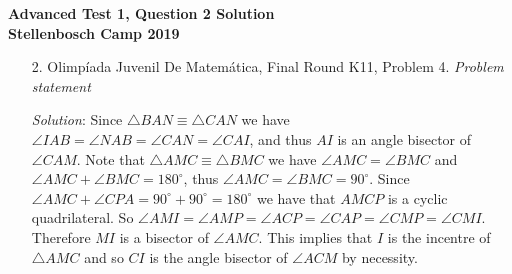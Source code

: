 \documentclass{article}
\begin{document}
\begin{center}
  \textbf{\Large Advanced Test 1, Question 2 Solution}
  \\ \vspace{1em}
  \textbf{\large Stellenbosch Camp 2019}
\end{center}


\begin{enumerate}

\item[2.] Olimp\'iada Juvenil De Matem\'atica, Final Round K11, Problem 4.
\textit{Problem statement}

\textit{Solution}: Since $\triangle BAN \equiv \triangle CAN$ we have $\angle IAB = \angle NAB = \angle CAN = \angle CAI $, and thus $AI$ is an angle bisector of $\angle CAM$. Note that $\triangle AMC \equiv \triangle BMC$ we have $\angle AMC = \angle BMC$ and $\angle AMC + \angle BMC =180^\circ$, thus $\angle AMC = \angle BMC = 90^\circ$. Since $\angle AMC + \angle CPA = 90^\circ +90^\circ =180^\circ$ we have that $AMCP$ is a cyclic quadrilateral. So $\angle AMI = \angle AMP = \angle ACP = \angle CAP = \angle CMP = \angle CMI$. Therefore $MI$ is a bisector of $\angle AMC$. This implies that $I$ is the incentre of $\triangle AMC$ and so $CI$ is the angle bisector of $\angle ACM$ by necessity.
\end{enumerate}
\end{document}

